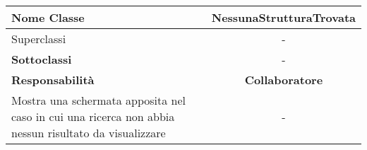 
\setcounter{table}{0}
\begin{table}[H]
    \centering
    \begin{tabularx}{\textwidth}{||   X  ||  c   ||}
        \hline
        \rowcolor{Gray}
        \textbf{Nome Classe} & NessunaStrutturaTrovata\\
        \hline
        Superclassi  &  - \\
        \hline
        \textbf{Sottoclassi} & - \\
        \hline
         \textbf{Responsabilità} & \textbf{Collaboratore} \\
         \hline
           Mostra una schermata apposita nel caso in cui una ricerca
           non abbia nessun risultato da visualizzare & - \\
         \hline
    \end{tabularx}
\end{table}
